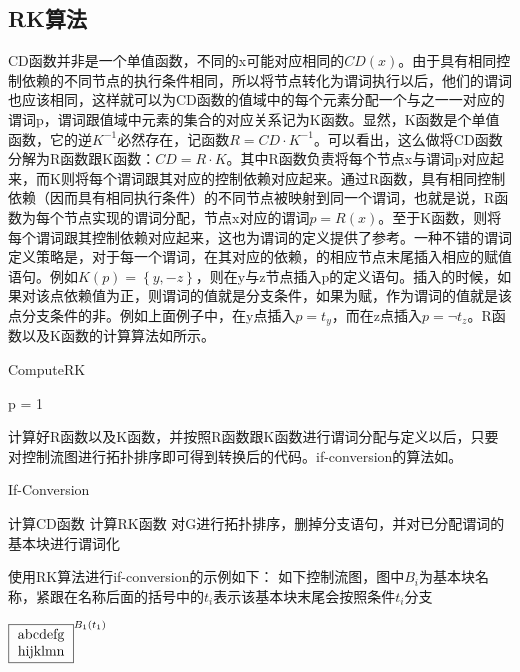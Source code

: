 \subsection{RK算法}

CD函数并非是一个单值函数，不同的x可能对应相同的$CD\left(x\right)$。由于具有相同控制依赖的不同节点的执行条件相同，所以将节点转化为谓词执行以后，他们的谓词也应该相同，这样就可以为CD函数的值域中的每个元素分配一个与之一一对应的谓词p，谓词跟值域中元素的集合的对应关系记为K函数。显然，K函数是个单值函数，它的逆$K^{-1}$必然存在，记函数$R=CD\cdot K^{-1}$。可以看出，这么做将CD函数分解为R函数跟K函数：$CD=R\cdot K$。其中R函数负责将每个节点x与谓词p对应起来，而K则将每个谓词跟其对应的控制依赖对应起来。通过R函数，具有相同控制依赖（因而具有相同执行条件）的不同节点被映射到同一个谓词，也就是说，R函数为每个节点实现的谓词分配，节点x对应的谓词$p=R\left(x\right)$。至于K函数，则将每个谓词跟其控制依赖对应起来，这也为谓词的定义提供了参考。一种不错的谓词定义策略是，对于每一个谓词，在其对应的依赖，的相应节点末尾插入相应的赋值语句。例如$K\left(p\right)=\left\{y,-z\right\}$，则在y与z节点插入p的定义语句。插入的时候，如果对该点依赖值为正，则谓词的值就是分支条件，如果为赋，作为谓词的值就是该点分支条件的非。例如上面例子中，在y点插入$p=t_y$，而在z点插入$p=\neg t_z$。R函数以及K函数的计算算法如所示。

\begin{algorithm}[H]
	\label{alg:ComputeRK}
	\caption{ComputeRK}
	p = 1
\end{algorithm}
计算好R函数以及K函数，并按照R函数跟K函数进行谓词分配与定义以后，只要对控制流图进行拓扑排序即可得到转换后的代码。if-conversion的算法如。

\begin{algorithm}[H]
	\label{alg:ifcvt}
	\caption{If-Conversion}
	计算CD函数\;
	计算RK函数\;
	对G进行拓扑排序，删掉分支语句，并对已分配谓词的基本块进行谓词化\;
\end{algorithm}

使用RK算法进行if-conversion的示例如下：
如下控制流图，图中$B_i$为基本块名称，紧跟在名称后面的括号中的$t_i$表示该基本块末尾会按照条件$t_i$分支

$\fbox{\parbox{4em}{\centering abcdefg \\ hijklmn}}^{B_1\left(t_1\right)}$